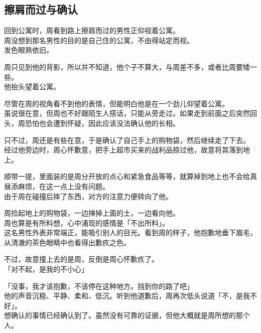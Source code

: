\subsection{擦肩而过与确认}

回到公寓时，周看到路上擦肩而过的男性正仰视着公寓。\\

周没想到那名男性的目的是自己住的公寓，不由得站定而视。\\

发色眼熟依旧。

周只见到他的背影，所以并不知道，他个子不算大，与周差不多，或者比周要矮一些。\\

他抬头望着公寓。

尽管在周的视角看不到他的表情，但能明白他是在一个劲儿仰望着公寓。\\

虽说很在意，但周也不好跟陌生人搭话，只能从旁走过。如果走到前面之后突然回头，周恐怕也会遭到怀疑，因此应该没法确认他的长相。

只不过，周还是有些在意，于是确认了自己手上的购物袋，然后继续走了下去。\\

经过他旁边时，周心怀歉意，把手上超市买来的战利品掠过他，故意将其落到地上。

顺带一提，里面装的是周分开放的点心和紧急食品等等，就算掉到地上也不会给真昼添麻烦，在这一点上没有问题。\\

由于周在碰撞后摔了东西，对方的注意力便转向了他。

周捡起地上的购物袋，一边掸掉上面的土，一边看向他。\\

周也算是有所料想，心中涌现的感情是「不出所料」。\\

这名男性外表非常端正，能吸引别人的目光。看到周的样子，他抱歉地垂下眉毛，从清澈的茶色眼睛中也看得出歉疚之色。

不过，故意撞上去的是周，反倒是周心怀歉疚了。\\

「对不起，是我的不小心」

「没事，我才该抱歉，不该停在这种地方。挡到你的路了吧」\\

他的声音沉稳、平静、柔和、低沉。听到他道歉后，周再次低头说道「不，是我不好」。\\

想确认的事情已经确认到了。虽然没有可靠的证据，但他大概就是周所想的那个人。\\

